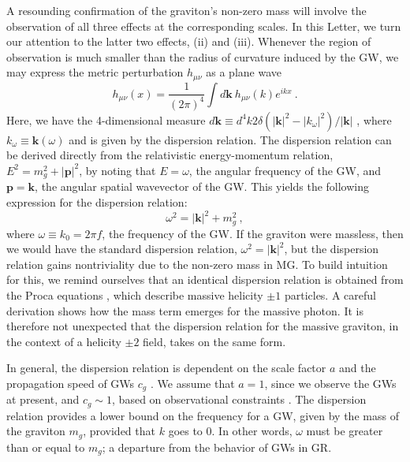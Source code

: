 \documentclass[10pt,prd,twocolumn,aps,nofootinbib,nobibnotes,superscriptaddress,preprintnumbers]{revtex4-2}
\begin{document}
A resounding confirmation of the graviton's non-zero mass will involve the observation of all three effects at the corresponding scales. In this Letter, we turn our attention to the latter two effects, (ii) and (iii). Whenever the region of observation is much smaller than the radius of curvature induced by the GW, we may express the metric perturbation $h_{\mu\nu}$ as a plane wave \cite{Isi:2018miq}
\begin{equation}\label{eqn:planewave}
    h_{\mu\nu}(x) = \frac{1}{(2\pi)^4}\int d\boldsymbol{k} \ h_{\mu\nu}(k) e^{ikx} \ .
\end{equation}
Here, we have the 4-dimensional measure $d\boldsymbol{k} \equiv d^4 k 2\delta(|\boldsymbol{k}|^2 - |k_{\omega}|^2)/|\boldsymbol{k}|$ \cite{Isi:2018miq}, where $k_{\omega} \equiv \boldsymbol{k}(\omega)$ and is given by the dispersion relation. The dispersion relation can be derived directly from the relativistic energy-momentum relation, $E^2 = m_g^2 + |{\boldsymbol{p}}|^2$, by noting that $E = \omega$, the angular frequency of the GW, and ${\boldsymbol{p}} = \boldsymbol{k}$, the angular spatial wavevector of the GW. This yields the following expression for the dispersion relation: 
\begin{equation}\label{eq:dispersion}
    \omega^2 = |\boldsymbol{k}|^2+ m_g^2 \ ,
\end{equation}
where $\omega \equiv k_0 = 2\pi f$, the frequency of the GW. If the graviton were massless, then we would have the standard dispersion relation, $\omega^2 = |\boldsymbol{k}|^2$, but the dispersion relation gains nontriviality due to the non-zero mass in MG. 
To build intuition for this, we remind ourselves that an identical dispersion relation is obtained from the Proca equations \cite{Proca:1936fbw}, which describe massive helicity $\pm 1$ particles. A careful derivation shows how the mass term emerges \cite{Wang:2024kir} for the massive photon. It is therefore not unexpected that the dispersion relation for the massive graviton, in the context of a helicity $\pm 2$ field, takes on the same form. 

In general, the dispersion relation is dependent on the scale factor $a$ and the propagation speed of GWs $c_g$ \cite{Gumrukcuoglu:2012wt}. We assume that $a=1$, since we observe the GWs at present, and $c_g \sim  1$, based on observational constraints \cite{LIGOScientific:2017vwq, LIGOScientific:2017zic, LIGOScientific:2017ync}.
The dispersion relation provides a lower bound on the frequency for a GW, given by the mass of the graviton $m_g$, provided that $k$ goes to 0. In other words, $\omega$ must be greater than or equal to $m_g$; a departure from the behavior of GWs in GR.
\end{document}
